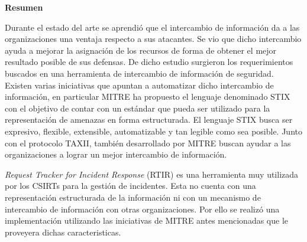 {\huge \bfseries Resumen \\[0.4cm]}

Durante el estado del arte se aprendió que el intercambio de información da a las organizaciones una ventaja respecto a sus atacantes. Se vio que dicho intercambio ayuda a mejorar la asignación de los recursos de forma de obtener el mejor resultado posible de sus defensas. De dicho estudio surgieron los requerimientos buscados en una herramienta de intercambio de información de seguridad. \\

Existen varias iniciativas que apuntan a automatizar dicho intercambio de información, en particular MITRE \cite{mitre} ha propuesto el lenguaje denominado STIX con el objetivo de contar con un estándar que pueda ser utilizado para la representación  de amenazas en forma estructurada. El lenguaje STIX busca ser expresivo, flexible, extensible, automatizable y tan legible como sea posible. Junto con el protocolo TAXII, también desarrollado por MITRE buscan ayudar a las organizaciones a lograr un mejor intercambio de información.

\textit{Request Tracker for Incident Response} (RTIR) es una herramienta muy utilizada por los CSIRTs para la gestión de incidentes. Esta no cuenta con una representación estructurada de la información ni con un mecanismo de intercambio de información con otras organizaciones. Por ello se realizó una implementación utilizando las iniciativas de MITRE antes mencionadas que le proveyera dichas caracteristicas.

